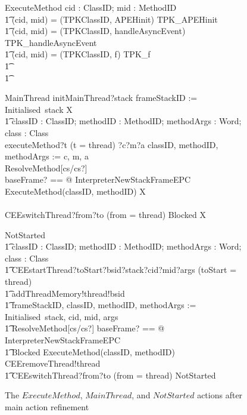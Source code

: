 \begin{figure}[t!]
  \setlength{\zedindent}{0cm}
  \setlength{\zedtab}{0.3cm}
  \setlength{\zedleftsep}{0.1cm}
  \begin{circusaction}
    ExecuteMethod \circdef \circval cid : ClassID; mid : MethodID \circspot \\
    \t1 \circif (cid, mid) = (TPKClassID, APEHinit) \circthen TPK\_APEHinit \\
    \t1 {} \circelse (cid, mid) = (TPKClassID, handleAsyncEvent) \circthen TPK\_handleAsyncEvent \\
    \t1 {} \circelse (cid, mid) = (TPKClassID, f) \circthen TPK\_f \\
    \t1 {} \cdots {} \\
    \t1 \circfi
  \end{circusaction}
  \begin{circusaction}
    MainThread \circdef initMainThread?stack \then frameStackID := Initialised~stack \circseq \circmu X \circspot \\
    \t1 \circblockbegin \circblockbegin
    \circvar classID : ClassID; methodID : MethodID; methodArgs : \seq Word; class : Class \circspot \\
    executeMethod?t \prefixcolon (t = thread) ?c?m?a \then classID, methodID, methodArgs := c, m, a \circseq \\
    \lschexpract ResolveMethod[cs/cs?] \rschexpract \circseq \\
    \lschexpract \exists baseFrame? == \true @ InterpreterNewStackFrameEPC \rschexpract \circseq \\
    ExecuteMethod(classID, methodID) \circseq X \circblockend \\
    {} \extchoice {} \\
    CEEswitchThread?from?to \prefixcolon (from = thread) \then Blocked \circseq X
    \circblockend
  \end{circusaction}
  \begin{circusaction}
    NotStarted \circdef \\
    \t1 \circvar classID : ClassID; methodID : MethodID; methodArgs : \seq Word; class : Class \circspot \\
    \t1 CEEstartThread?toStart?bsid?stack?cid?mid?args \prefixcolon (toStart = thread) \then {} \\
    \t1 addThreadMemory!thread!bsid \then {} \\
    \t1 frameStackID, classID, methodID, methodArgs := Initialised~stack, cid, mid, args \circseq \\
    \t1 \lschexpract ResolveMethod[cs/cs?] \rschexpract \circseq \lschexpract \exists baseFrame? == \true @ InterpreterNewStackFrameEPC \rschexpract \circseq \\
    \t1 Blocked \circseq ExecuteMethod(classID, methodID) \circseq CEEremoveThread!thread \then {} \\
    \t1 CEEswitchThread?from?to \prefixcolon (from = thread) \then NotStarted
  \end{circusaction}
  \caption{The $ExecuteMethod$, $MainThread$, and $NotStarted$ actions
    after main action refinement}
  \label{refine-main-actions-example-figure}
\end{figure}

